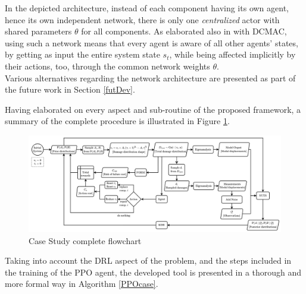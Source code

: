 In the depicted architecture, instead of each component having its own agent, hence its own independent network, there is only one \textit{centralized} actor with shared parameters $\theta$ for all components. As elaborated also in \cite{andriotis2019managing} with \gls{DCMAC}, using such a network means that every agent is aware of all other agents' states, by getting as input the entire system state $s_t$, while being affected implicitly by their actions, too, through the common network weights $\theta$.\\

Various alternatives regarding the network architecture are presented as part of the future work in Section \ref{futDev}.


Having elaborated on every aspect and sub-routine of the proposed framework, a summary of the complete procedure is illustrated in Figure \ref{flowCase}.

\vspace{1cm}

\begin{figure}[H]
    \centering
	\includegraphics[width=\linewidth]{Figures/caseFlow.png}
	\caption{Case Study complete flowchart}
	\label{flowCase}
\end{figure}

\restoregeometry

Taking into account the \gls{DRL} aspect of the problem, and the steps included in the training of the \gls{PPO} agent, the developed tool is presented in a thorough and more formal way in Algorithm \ref{PPOcase}.\\

